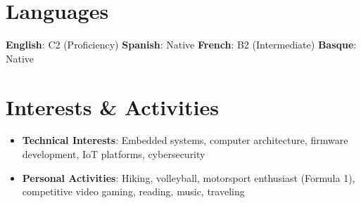 \documentclass[letterpaper,11pt]{article}
\newcommand{\resumeSubHeadingListStart}{\begin{itemize}[leftmargin=*]}
\newcommand{\resumeSubHeadingListEnd}{\end{itemize}}
\begin{document}

\section{Languages}
    {\textbf{English}}{: C2 (Proficiency)}
    \hfill\textbf{Spanish}{: Native}
    \hfill\textbf{French}{: B2 (Intermediate)}
    \hfill\textbf{Basque}{: Native}



\section{Interests \& Activities}
\resumeSubHeadingListStart
  \item{
    \textbf{Technical Interests}{: Embedded systems, computer architecture, firmware development, IoT platforms, cybersecurity}
    }
  \item{
    \textbf{Personal Activities}{: Hiking, volleyball, motorsport enthusiast (Formula 1), competitive video gaming, reading, music, traveling}
    }
\resumeSubHeadingListEnd

\end{document}

